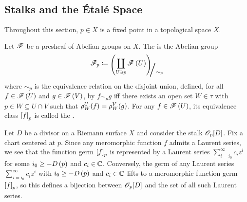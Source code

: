 \documentclass[../Moduli_Spaces_of_Riemann_Surfaces.tex]{subfiles}
\begin{document}
    \subsection{Stalks and the Étalé Space}
    Throughout this section, $p\in X$ is a fixed point in a topological space $X$.
    \begin{definition}\label{2.2:def:stalk}
        Let $\mathscr{F}$ be a presheaf of Abelian groups on $X$. The  is the Abelian group
        \begin{equation*}
            \ms{F}_p\coloneqq\raisebox{-2pt}{$\Biggl(\!$}\coprod_{U\ni p}\ms{F}\l(U\r)\!\raisebox{-2pt}{$\Biggr)$}\!\!_{\scalebox{2}{/}\sim_p}
        \end{equation*}
        where $\sim_p$ is the equivalence relation on the disjoint union, defined, for all $f\in\mathscr{F}\left(U\right)$ and $g\in\mathscr{F}\left(V\right)$, by $f\sim_p g$ iff there exists an open set $W\in\tau$ with $p\in W\subseteq U\cap V$ such that $\rho^U_W\!\left(f\right)=\rho^V_W\!\left(g\right)$. For any $f\in\mathscr{F}\left(U\right)$, its equivalence class $\left[f\right]_p$ is called the .
    \end{definition}
    \vspace{-0.05in}
    \begin{example}
        Let $D$ be a divisor on a Riemann surface $X$ and consider the stalk $\mathscr{O}_p\!\left[D\right]$. Fix a chart centered at $p$. Since any meromorphic function $f$ admits a Laurent series, we see that the function germ $\left[f\right]_p$ is represented by a Laurent series $\sum_{i=i_0}^{\infty}c_iz^i$ for some $i_0\geq-D\left(p\right)$ and $c_i\in\mathbb{C}$. Conversely, the germ of any Laurent series $\sum_{i=i_0}^{\infty}c_iz^i$ with $i_0\geq-D\left(p\right)$ and $c_i\in\mathbb{C}$ lifts to a meromorphic function germ $\left[f\right]_p$, so this defines a bijection between $\mathscr{O}_p\!\left[D\right]$ and the set of all such Laurent series.\exqed
    \end{example}
\end{document}
